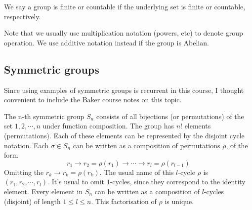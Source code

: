 \begin{definition}
  We say a group is finite or countable if the underlying set is finite or countable,
  respectively.
\end{definition}
Note that we usually use multiplication notation (powers, etc) to denote group operation.
We use additive notation instead if the group is Abelian.

\subsection{Symmetric groups}
Since using examples of symmetric groups is recurrent in this course, I thought convenient
to include the Baker course notes on this topic. 

The n-th symmetric group $S_n$ consists of all bijections (or permutations) of the set
${1,2,\cdots , n}$ under function composition. The group has $n!$ elements (permutations).
Each of these elements can be represented by the disjoint cycle notation. Each $\sigma\in
S_n$ can be written as a composition of permutations $\rho$, of the form
\[r_1\to r_2=\rho(r_1) \to \cdots \to r_l=\rho(r_{l-1})\]
Omitting the $r_k\to r_k=\rho(r_k)$. The usual name of this $l$-cycle $\rho$ is
$(r_1, r_2, \cdots, r_l)$. It's usual to omit $1$-cycles, since they correspond to the
identity element. Every element in $S_n$ can be written as a composition of $l$-cycles
(disjoint) of length $1\leq l \leq n$. This factorisation of $\rho$ is unique.

